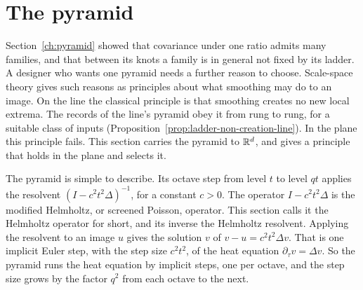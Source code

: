 \section{The \Matern{} pyramid}
\label{ch:matern}

Section~\ref{ch:pyramid} showed that covariance under one ratio admits many families, and that
between its knots a family is in general not fixed by its ladder. A designer who wants one pyramid
needs a further reason to choose. Scale-space theory gives such reasons as principles about what
smoothing may do to an image. On the line the classical principle is that smoothing creates no new
local extrema. The records of the line's \Matern{} pyramid obey it from rung to rung, for a suitable
class of inputs (Proposition~\ref{prop:ladder-non-creation-line}). In the plane this principle
fails. This section carries the \Matern{} pyramid to $\mathbb{R}^d$, and gives a principle that holds in
the plane and selects it.

The pyramid is simple to describe. Its octave step from level $t$ to level $qt$ applies the
resolvent $(I - c^2t^2\Delta)^{-1}$, for a constant $c > 0$. The operator $I - c^2t^2\Delta$ is the
modified Helmholtz, or screened Poisson, operator. This section calls it the Helmholtz operator for
short, and its inverse the Helmholtz resolvent. Applying the resolvent to an image $u$ gives the
solution $v$ of $v - u = c^2t^2\Delta v$. That is one implicit Euler step, with the step size
$c^2t^2$, of the heat equation $\partial_\tau v = \Delta v$. So the pyramid runs the heat equation by
implicit steps, one per octave, and the step size grows by the factor $q^2$ from each octave to the
next.

